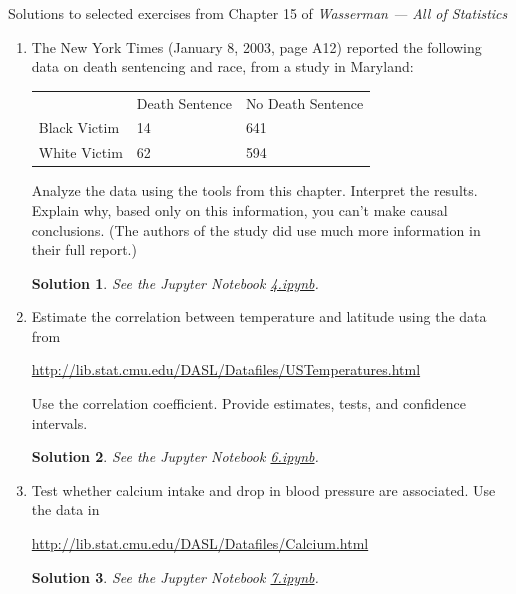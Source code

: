 \documentclass[10pt]{article}
\newtheorem*{sol}{Solution}
\begin{document}
\noindent \large{Solutions to selected exercises from Chapter 15 of
\emph{Wasserman --- All of Statistics}}

\begin{enumerate}

\item[(4)] The New York Times (January 8, 2003, page A12) reported the following
data on death sentencing and race, from a study in Maryland:

\begin{center}
\begin{tabular}{l l l}
& Death Sentence & No Death Sentence \\
Black Victim & 14 & 641 \\
White Victim & 62 & 594 \\
\end{tabular}
\end{center}

Analyze the data using the tools from this chapter. Interpret the results.
Explain why, based only on this information, you can't make causal
conclusions. (The authors of the study did use much more information
in their full report.)

\begin{sol}
See the Jupyter Notebook
\href{https://github.com/ajrasmus/some_of_statistics/blob/main/chapter_15/4.ipynb}{4.ipynb}.
\end{sol}

\item[(6)]

Estimate the correlation between temperature and latitude using the
data from

\href{http://lib.stat.cmu.edu/DASL/Datafiles/USTemperatures.html}
{http://lib.stat.cmu.edu/DASL/Datafiles/USTemperatures.html}

Use the correlation coefficient. Provide estimates, tests, and confidence
intervals.

\begin{sol}
See the Jupyter Notebook
\href{https://github.com/ajrasmus/some_of_statistics/blob/main/chapter_15/6.ipynb}{6.ipynb}.
\end{sol}

\item[(7)] Test whether calcium intake and drop in blood pressure are associated.
Use the data in

\href{http://lib.stat.cmu.edu/DASL/Datafiles/Calcium.html}
{http://lib.stat.cmu.edu/DASL/Datafiles/Calcium.html}

\begin{sol}
See the Jupyter Notebook
\href{https://github.com/ajrasmus/some_of_statistics/blob/main/chapter_15/7.ipynb}{7.ipynb}.
\end{sol}

\end{enumerate}
\end{document}
